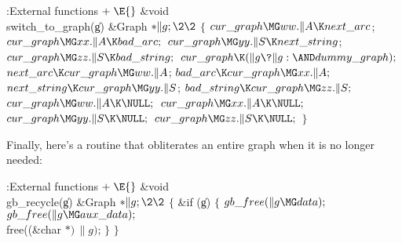 \Y\B\4:External functions\X${}\mathrel+\E{}$\6
\1\1\&{void} \\{switch\_to\_graph}(\|g)\6
\&{Graph} ${}{*}\|g;\2\2{}$\6
${}\{{}$\1\6
${}\\{cur\_graph}\MG\\{ww}.\|A\K\\{next\_arc}{}$;\5
${}\\{cur\_graph}\MG\\{xx}.\|A\K\\{bad\_arc};{}$\6
${}\\{cur\_graph}\MG\\{yy}.\|S\K\\{next\_string}{}$;\5
${}\\{cur\_graph}\MG\\{zz}.\|S\K\\{bad\_string};{}$\6
${}\\{cur\_graph}\K(\|g\?\|g:{\AND}\\{dummy\_graph});{}$\6
${}\\{next\_arc}\K\\{cur\_graph}\MG\\{ww}.\|A{}$;\5
${}\\{bad\_arc}\K\\{cur\_graph}\MG\\{xx}.\|A;{}$\6
${}\\{next\_string}\K\\{cur\_graph}\MG\\{yy}.\|S{}$;\5
${}\\{bad\_string}\K\\{cur\_graph}\MG\\{zz}.\|S;{}$\6
${}\\{cur\_graph}\MG\\{ww}.\|A\K\NULL;{}$\6
${}\\{cur\_graph}\MG\\{xx}.\|A\K\NULL;{}$\6
${}\\{cur\_graph}\MG\\{yy}.\|S\K\NULL;{}$\6
${}\\{cur\_graph}\MG\\{zz}.\|S\K\NULL;{}$\6
\4${}\}{}$\2\par
\fi

Finally,
here's a routine that obliterates an entire graph when it is no longer needed:

\Y\B\4:External functions\X${}\mathrel+\E{}$\6
\1\1\&{void} \\{gb\_recycle}(\|g)\6
\&{Graph} ${}{*}\|g;\2\2{}$\6
${}\{{}$\1\6
\&{if} (\|g)\5
${}\{{}$\1\6
${}\\{gb\_free}(\|g\MG\\{data});{}$\6
${}\\{gb\_free}(\|g\MG\\{aux\_data});{}$\6
\\{free}((\&{char} ${}{*})\,\|g){}$;\6
\4${}\}{}$\2\6
\4${}\}{}$\2\par
\fi

